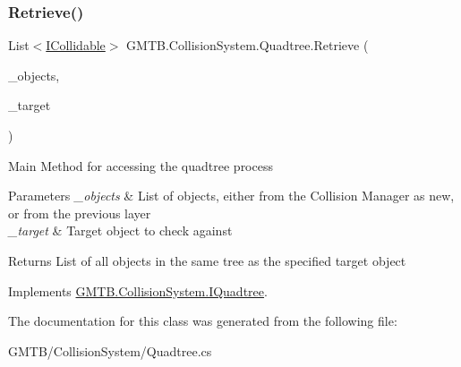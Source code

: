 \subsubsection{\texorpdfstring{Retrieve()}{Retrieve()}}
{\footnotesize\ttfamily List$<$\mbox{\hyperlink{interface_g_m_t_b_1_1_collision_system_1_1_i_collidable}{I\+Collidable}}$>$ G\+M\+T\+B.\+Collision\+System.\+Quadtree.\+Retrieve (\begin{DoxyParamCaption}\item[{List$<$ \mbox{\hyperlink{interface_g_m_t_b_1_1_collision_system_1_1_i_collidable}{I\+Collidable}} $>$}]{\+\_\+objects,  }\item[{\mbox{\hyperlink{interface_g_m_t_b_1_1_collision_system_1_1_i_collidable}{I\+Collidable}}}]{\+\_\+target }\end{DoxyParamCaption})}



Main Method for accessing the quadtree process 


\begin{DoxyParams}{Parameters}
{\em \+\_\+objects} & List of objects, either from the Collision Manager as new, or from the previous layer \\
\hline
{\em \+\_\+target} & Target object to check against \\
\hline
\end{DoxyParams}
\begin{DoxyReturn}{Returns}
List of all objects in the same tree as the specified target object 
\end{DoxyReturn}


Implements \mbox{\hyperlink{interface_g_m_t_b_1_1_collision_system_1_1_i_quadtree_a1d7564249805855fa89288bde1a673a9}{G\+M\+T\+B.\+Collision\+System.\+I\+Quadtree}}.



The documentation for this class was generated from the following file\+:\begin{DoxyCompactItemize}
\item 
G\+M\+T\+B/\+Collision\+System/Quadtree.\+cs\end{DoxyCompactItemize}
